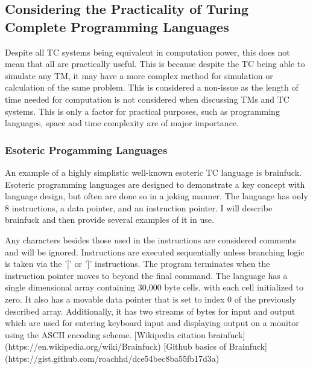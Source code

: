 \subsection{Considering the Practicality of Turing Complete Programming Languages}

Despite all TC systems being equivalent in computation power, this does not mean that all are practically useful.
This is because despite the TC being able to simulate any TM, it may have a more complex method for simulation or calculation of the same problem.
This is considered a non-issue as the length of time needed for computation is not considered when discussing TMs and TC systems.
This is only a factor for practical purposes, such as programming languages, space and time complexity are of major importance.

\subsubsection{Esoteric Progamming Languages}

An example of a highly simplistic well-known esoteric TC language is brainfuck.
Esoteric programming languages are designed to demonstrate a key concept with language design, but often are done so in a joking manner.
The language has only 8 instructions, a data pointer, and an instruction pointer.
I will describe brainfuck and then provide several examples of it in use.

Any characters besides those used in the instructions are considered comments and will be ignored.
Instructions are executed sequentially unless branching logic is taken via the '[' or ']' instructions.
The program terminates when the instruction pointer moves to beyond the final command.
The language has a single dimensional array containing 30,000 byte cells, with each cell initialized to zero.
It also has a movable data pointer that is set to index 0 of the previously described array.
Additionally, it has two streams of bytes for input and output which are used for entering keyboard input and displaying output on a monitor using the ASCII encoding scheme.
[Wikipedia citation brainfuck](https://en.wikipedia.org/wiki/Brainfuck)
[Github basics of Brainfuck](https://gist.github.com/roachhd/dce54bec8ba55fb17d3a)

